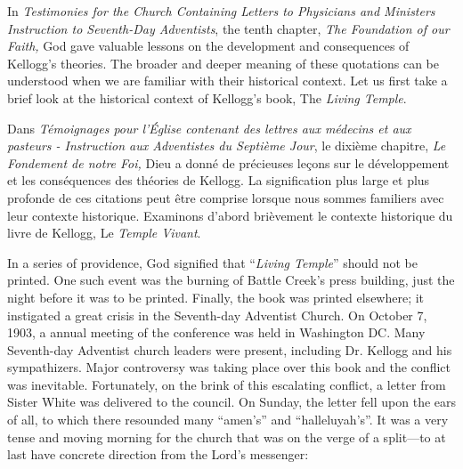 



In \textit{Testimonies for the Church Containing Letters to Physicians and Ministers Instruction to Seventh-Day Adventists}, the tenth chapter, \textit{The Foundation of our Faith,} God gave valuable lessons on the development and consequences of Kellogg's theories. The broader and deeper meaning of these quotations can be understood when we are familiar with their historical context. Let us first take a brief look at the historical context of Kellogg's book, The \textit{Living Temple}.


Dans \textit{Témoignages pour l'Église contenant des lettres aux médecins et aux pasteurs - Instruction aux Adventistes du Septième Jour}, le dixième chapitre, \textit{Le Fondement de notre Foi,} Dieu a donné de précieuses leçons sur le développement et les conséquences des théories de Kellogg. La signification plus large et plus profonde de ces citations peut être comprise lorsque nous sommes familiers avec leur contexte historique. Examinons d'abord brièvement le contexte historique du livre de Kellogg, Le \textit{Temple Vivant}.


In a series of providence, God signified that “\textit{Living Temple}” should not be printed. One such event was the burning of Battle Creek's press building, just the night before it was to be printed. Finally, the book was printed elsewhere; it instigated a great crisis in the Seventh-day Adventist Church. On October 7, 1903, a annual meeting of the conference was held in Washington DC. Many Seventh-day Adventist church leaders were present, including Dr. Kellogg and his sympathizers. Major controversy was taking place over this book and the conflict was inevitable. Fortunately, on the brink of this escalating conflict, a letter from Sister White was delivered to the council. On Sunday, the letter fell upon the ears of all, to which there resounded many “amen's” and “halleluyah's”. It was a very tense and moving morning for the church that was on the verge of a split—to at last have concrete direction from the Lord's messenger:


